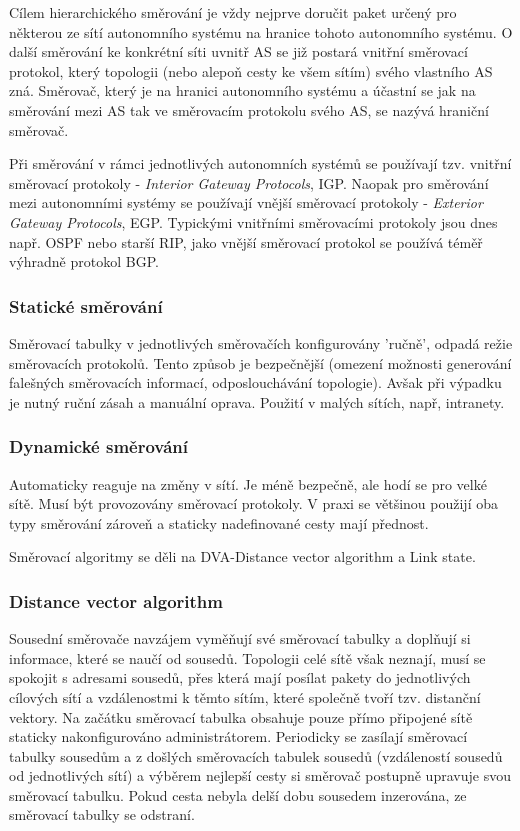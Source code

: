 Cílem hierarchického směrování je vždy nejprve doručit paket určený pro některou ze sítí autonomního systému na hranice tohoto autonomního systému. O další směrování ke konkrétní síti uvnitř AS se již postará vnitřní směrovací protokol, který topologii (nebo alepoň cesty ke všem 
sítím) svého vlastního AS zná. Směrovač, který je na hranici autonomního systému a účastní se jak na směrování mezi AS tak ve směrovacím protokolu svého AS, se nazývá hraniční směrovač.

Při směrování v rámci jednotlivých autonomních systémů se používají tzv. vnitřní směrovací 
protokoly - \textit{Interior Gateway Protocols}, IGP. Naopak pro směrování mezi autonomními systémy se používají vnější směrovací protokoly - \textit{Exterior Gateway Protocols}, EGP. Typickými vnitřními směrovacími protokoly jsou dnes např. OSPF nebo starší RIP, jako vnější směrovací protokol se používá téměř výhradně protokol BGP.

\subsubsection{Statické směrování}
Směrovací tabulky v jednotlivých směrovačích konfigurovány 'ručně', odpadá režie směrovacích protokolů. Tento způsob je bezpečnější (omezení možnosti generování falešných směrovacích informací, odposlouchávání topologie). Avšak při výpadku je nutný ruční zásah a manuální oprava. Použití v malých sítích, např, intranety.

\subsubsection{Dynamické směrování}
Automaticky reaguje na změny v sítí. Je méně bezpečně, ale hodí se pro velké sítě. Musí být provozovány směrovací protokoly. V praxi se většinou použijí oba typy směrování zároveň a staticky nadefinované cesty mají přednost.

Směrovací algoritmy se děli na DVA-Distance vector algorithm a Link state.

\subsubsection{Distance vector algorithm}
Sousední směrovače navzájem vyměňují své směrovací tabulky a doplňují si informace, které se naučí od sousedů. Topologii celé sítě však neznají, musí se 
spokojit s adresami sousedů, přes která mají posílat pakety do jednotlivých cílových sítí a vzdálenostmi k těmto sítím, které společně tvoří tzv. distanční vektory. Na začátku směrovací tabulka obsahuje pouze přímo připojené sítě staticky nakonfigurováno administrátorem.
Periodicky se zasílají směrovací tabulky sousedům a z došlých směrovacích tabulek sousedů (vzdáleností sousedů od jednotlivých sítí) a výběrem nejlepší cesty si směrovač postupně upravuje svou směrovací tabulku. Pokud cesta nebyla delší dobu sousedem inzerována, ze směrovací tabulky se odstraní. 

